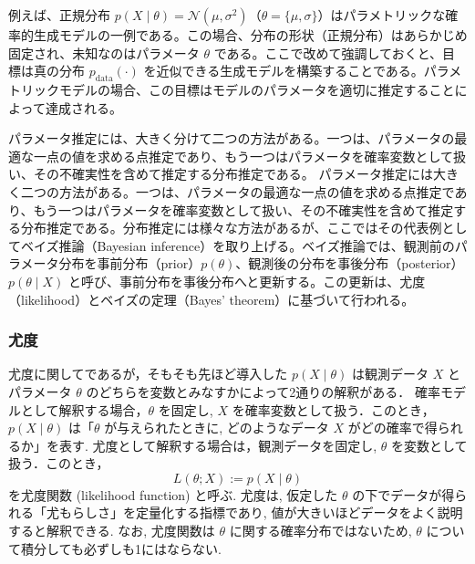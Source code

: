 \documentclass[titlepage]{ltjsbook}
\begin{document}
例えば、正規分布 $p(X \mid \theta) = \mathcal{N}(\mu, \sigma^2)$（$\theta = \{\mu, \sigma\}$）はパラメトリックな確率的生成モデルの一例である。この場合、分布の形状（正規分布）はあらかじめ固定され、未知なのはパラメータ $\theta$ である。ここで改めて強調しておくと、目標は真の分布 $p_{\mathrm{data}}(\cdot)$ を近似できる生成モデルを構築することである。パラメトリックモデルの場合、この目標はモデルのパラメータを適切に推定することによって達成される。

パラメータ推定には、大きく分けて二つの方法がある。一つは、パラメータの最適な一点の値を求める点推定であり、もう一つはパラメータを確率変数として扱い、その不確実性を含めて推定する分布推定である。
パラメータ推定には大きく二つの方法がある。一つは、パラメータの最適な一点の値を求める点推定であり、もう一つはパラメータを確率変数として扱い、その不確実性を含めて推定する分布推定である。分布推定には様々な方法があるが、ここではその代表例としてベイズ推論（Bayesian inference）を取り上げる。ベイズ推論では、観測前のパラメータ分布を事前分布（prior）$p(\theta)$、観測後の分布を事後分布（posterior）$p(\theta \mid X)$ と呼び、事前分布を事後分布へと更新する。この更新は、尤度（likelihood）とベイズの定理（Bayes’ theorem）に基づいて行われる。

\subsubsection{尤度}
尤度に関してであるが，そもそも先ほど導入した $p(X \mid \theta)$ は観測データ $X$ とパラメータ $\theta$ のどちらを変数とみなすかによって2通りの解釈がある．
確率モデルとして解釈する場合，$\theta$ を固定し, $X$ を確率変数として扱う．このとき，$p(X \mid \theta)$ は「$\theta$ が与えられたときに, どのようなデータ $X$ がどの確率で得られるか」を表す. 
尤度として解釈する場合は，観測データを固定し, $\theta$ を変数として扱う．このとき，
\begin{equation}
L(\theta; X) := p(X \mid \theta)
\end{equation}
を尤度関数 (likelihood function) と呼ぶ. 尤度は, 仮定した $\theta$ の下でデータが得られる「尤もらしさ」を定量化する指標であり, 値が大きいほどデータをよく説明すると解釈できる. なお, 尤度関数は $\theta$ に関する確率分布ではないため, $\theta$ について積分しても必ずしも1にはならない. 
\end{document}
